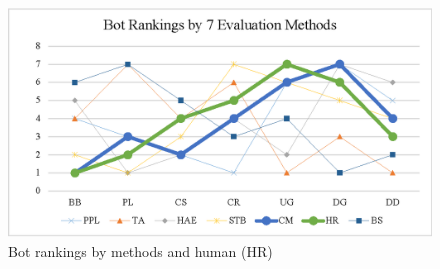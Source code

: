 %  


\begin{figure}[th]
\centering
\includegraphics[width=0.9\columnwidth]{rank.eps}
\caption{Bot rankings by methods and human (HR)}
\label{fig:botranks}
\end{figure}


